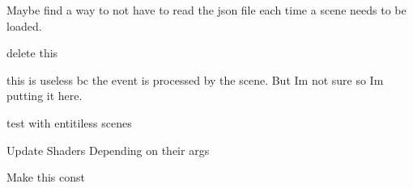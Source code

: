 
\begin{DoxyRefList}
\item[Class \mbox{\hyperlink{class_game}{Game}} ]\label{todo__todo000003}%
%
Maybe find a way to not have to read the json file each time a scene needs to be loaded. 
\item[Member \mbox{\hyperlink{class_game_a472279479c423e4950f6eedf09bf8bf5}{Game\+::add\+Entity}} (\mbox{\hyperlink{class_entity}{Entity}} $\ast$entity)]\label{todo__todo000005}%
%
delete this 
\item[Member \mbox{\hyperlink{class_game_a8343a84bc062e46afc71a4d7aadc6351}{Game\+::process\+Event}} (\mbox{\hyperlink{class_spawn_entity_event}{Spawn\+Entity\+Event}} $\ast$event)]\label{todo__todo000004}%
%
this is useless bc the event is processed by the scene. But I\textquotesingle{}m not sure so I\textquotesingle{}m putting it here. 
\item[Member \mbox{\hyperlink{namespace_parser_afac688a0903dec250282357577787197}{Parser\+::parse\+Scene\+Entities}} (std\+::string name, std\+::string filepath=\char`\"{}\+Data/\+Game\+Data/entity\+Data.\+json\char`\"{})]\label{todo__todo000001}%
%
test with entitiless scenes  
\item[Member \mbox{\hyperlink{class_render_engine_a3fd5129c749a1493da6d3113bd431b1e}{Render\+Engine\+::update\+Shaders}} ()]\label{todo__todo000002}%
%
Update Shaders Depending on their args 
\item[Member \mbox{\hyperlink{class_scene_adc1d9e6de5e4d7a9b85dd1af6602448c}{Scene\+::get\+Entity}} (std\+::string name) const]\label{todo__todo000006}%
%
Make this const
\end{DoxyRefList}